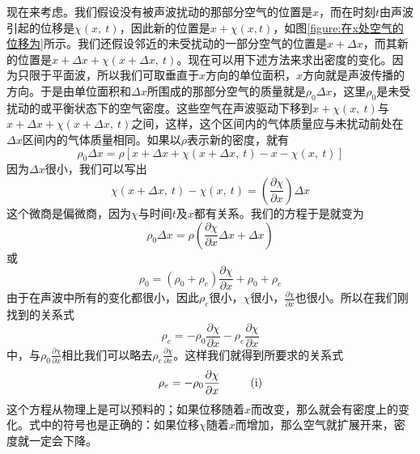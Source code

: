 现在来考虑\uppercase\expandafter{}。我们假设没有被声波扰动的那部分空气的位置是$x$，而在时刻$t$由声波引起的位移是$\chi(x,~t)$，因此新的位置是$x+\chi(x,t)$，如图\ref{figure:在x处空气的位移为}所示。我们还假设邻近的未受扰动的一部分空气的位置是$x +\Delta x$，而其新的位置是$x +\Delta x +\chi(x +\Delta x,~t)$。现在可以用下述方法来求出密度的变化。因为只限于平面波，所以我们可取垂直于$x$方向的单位面积，$x$方向就是声波传播的方向。于是由单位面积和$\Delta x$所围成的那部分空气的质量就是$\rho_0 \Delta x$，这里$\rho_0$是未受扰动的或平衡状态下的空气密度。这些空气在声波驱动下移到$x +\chi(x,~t)$与$x +\Delta x +\chi(x +\Delta x,~t)$之间，这样，这个区间内的气体质量应与未扰动前处在$\Delta x$区间内的气体质量相同。如果以$\rho$表示新的密度，就有
\begin{equation}
    \label{Eq:I:47:5}
    \rho_0 \Delta x = \rho\left[x+\Delta x+\chi(x+\Delta x,~t) - x - \chi(x,~t)\right]
\end{equation}
因为$\Delta x$很小，我们可以写出
\begin{equation*}
    \chi(x+\Delta x,~t) - \chi(x,~t) = \left(\frac{\partial \chi}{\partial x}\right)\Delta x
\end{equation*}
这个微商是偏微商，因为$\chi$与时间$t$及$x$都有关系。我们的方程于是就变为
\begin{equation}
    \label{Eq:I:47:6}
    \rho_0\Delta x = \rho\left(\frac{\partial\chi}{\partial x}\Delta x+\Delta x\right)
\end{equation}
或
\begin{equation}
    \label{Eq:I:47:7}
    \rho_0 = (\rho_0+\rho_e)\frac{\partial \chi}{\partial x} + \rho_0 + \rho_e
\end{equation}
由于在声波中所有的变化都很小，因此$\rho_e$很小，$\chi$很小，$\frac{\partial\chi}{\partial x}$也很小。所以在我们刚找到的关系式
\begin{equation}
    \label{Eq:I:47:8}
    \rho_e = -\rho_0\frac{\partial\chi}{\partial x} - \rho_e\frac{\partial\chi}{\partial x}
\end{equation}
中，与$\rho_0\frac{\partial\chi}{\partial x}$相比我们可以略去$\rho_e\frac{\partial\chi}{\partial x}$。这样我们就得到\uppercase\expandafter{}所要求的关系式
\begin{equation}
    \label{Eq:I:47:9}
    \rho_e = -\rho_0\frac{\partial\chi}{\partial x} ~~~~~~~~ \text{(\uppercase\expandafter{\romannumeral1})}
\end{equation}
这个方程从物理上是可以预料的；如果位移随着$x$而改变，那么就会有密度上的变化。式中的符号也是正确的：如果位移$\chi$随着$x$而增加，那么空气就扩展开来，密度就一定会下降。

